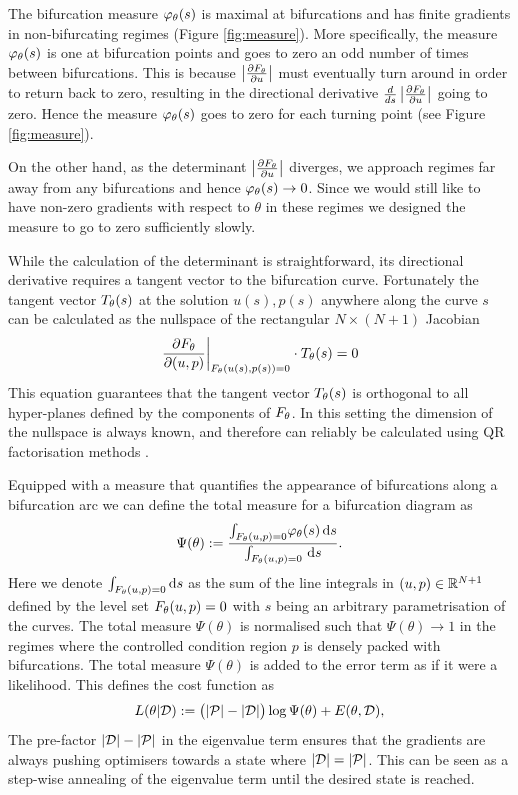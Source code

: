 \documentclass{article}
\begin{document}
The bifurcation measure $\varphi_{\theta}(s)$ is maximal at bifurcations and has finite gradients in non-bifurcating regimes (Figure \ref{fig:measure}). More specifically, the measure $\varphi_{\theta}(s)$ is one at bifurcation points and goes to zero an odd number of times between bifurcations. This is because $\left| \frac{\partial F_{\theta}}{\partial u} \right|$ must eventually turn around in order to return back to zero, resulting in the directional derivative $\frac{d}{ds}\left| \frac{\partial F_{\theta}}{\partial u} \right|$ going to zero. Hence the measure $\varphi_{\theta}(s)$ goes to zero for each turning point (see Figure \ref{fig:measure}).

On the other hand, as the determinant $\left| \frac{\partial F_{\theta}}{\partial u} \right|$ diverges, we approach regimes far away from any bifurcations and hence $\varphi_{\theta}(s)\rightarrow0$. Since we would still like to have non-zero gradients with respect to $\theta$ in these regimes we designed the measure to go to zero sufficiently slowly.
\clearpage

While the calculation of the determinant is straightforward, its directional derivative requires a tangent vector to the bifurcation curve. Fortunately the tangent vector $T_{\theta}(s)$ at the solution $u(s),p(s)$ anywhere along the curve $s$ can be calculated as the nullspace of the rectangular $N\times(N+1)$ Jacobian
\begin{equation}
    \left.
    \frac{\partial F_{\theta}}{\partial(u,p)}
    \right|_{F_{\theta}(u(s),p(s))=0}
    \cdot T_{\theta}(s)=0
    \label{eq:tangent}
\end{equation}
This equation guarantees that the tangent vector $T_{\theta}(s)$ is orthogonal to all hyper-planes defined by the components of $F_{\theta}$. In this setting the dimension of the nullspace is always known, and therefore can reliably be calculated using QR factorisation methods \cite{Drmac2008OnStudy}.

Equipped with a measure that quantifies the appearance of bifurcations along a bifurcation arc we can define the total measure for a bifurcation diagram as
\begin{equation}
    \Psi(\theta):=\frac{
        \int_{F_{\theta}(u,p)=0}\!
        \varphi_{\theta}(s)\,\mathrm{d}s
    }{
        \int_{F_{\theta}(u,p)=0}\!\
        \mathrm{d}s
    }.
    \label{eq:total-measure}
\end{equation}
Here we denote $\int_{F_{\theta}(u,p)=0}\mathrm{d}s$ as the sum of the line integrals in $(u,p)\in\mathbb{R}^{N+1}$ defined by the level set $F_{\theta}(u,p)=0$ with $s$ being an arbitrary parametrisation of the curves. The total measure $\Psi(\theta)$ is normalised such that $\Psi(\theta)\rightarrow1$ in the regimes where the controlled condition region $p$ is densely packed with bifurcations. The total measure $\Psi(\theta)$ is added to the error term as if it were a likelihood. This defines the cost function as
\begin{align}
    L(\theta|\mathcal{D}):=
    \big(|\mathcal{P}|-|\mathcal{D}|\big)\log\Psi(\theta)+
    E(\theta, \mathcal{D}),
    \label{eq:loss}
\end{align}
The pre-factor $|\mathcal{D}|-|\mathcal{P}|$ in the eigenvalue term ensures that the gradients are always pushing optimisers towards a state where $|\mathcal{D}|=|\mathcal{P}|$. This can be seen as a step-wise annealing of the eigenvalue term until the desired state is reached.
\end{document}
